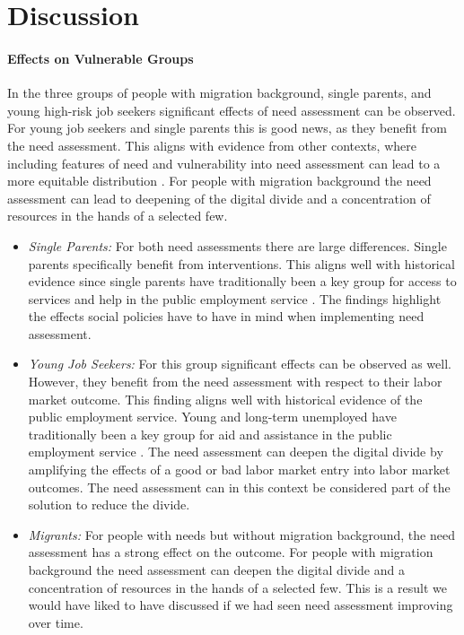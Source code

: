 \documentclass{article} %
\begin{document}
\section{Discussion}

\label{sec:discussion}

\paragraph{Effects on Vulnerable Groups}
\label{sec:discussion_groups}
In the three groups of people with migration background, single parents, and young high-risk job seekers significant effects of need assessment can be observed. For young job seekers and single parents this is good news, as they benefit from the need assessment. This aligns with evidence from other contexts, where including features of need and vulnerability into need assessment can lead to a more equitable distribution \citep{chan2012}. For people with migration background the need assessment can lead to deepening of the digital divide and a concentration of resources in the hands of a selected few.
\begin{itemize}
\item \emph{Single Parents:} For both need assessments there are large differences. Single parents specifically benefit from interventions. This aligns well with historical evidence since single parents have traditionally been a key group for access to services and help in the public employment service \citep{Kallus03042021}. The findings highlight the effects social policies have to have in mind when implementing need assessment. 
\item \emph{Young Job Seekers:} For this group significant effects can be observed as well. However, they benefit from the need assessment with respect to their labor market outcome. This finding aligns well with historical evidence of the public employment service. Young and long-term unemployed have traditionally been a key group for aid and assistance in the public employment service \citep{Kallus03042021}. The need assessment can deepen the digital divide by amplifying the effects of a good or bad labor market entry into labor market outcomes. The need assessment can in this context be considered part of the solution to reduce the divide.
\item \emph{Migrants:} For people with needs but without migration background, the need assessment has a strong effect on the outcome. For people with migration background the need assessment can deepen the digital divide and a concentration of resources in the hands of a selected few. This is a result we would have liked to have discussed if we had seen need assessment improving over time.
\end{itemize}
\end{document}
